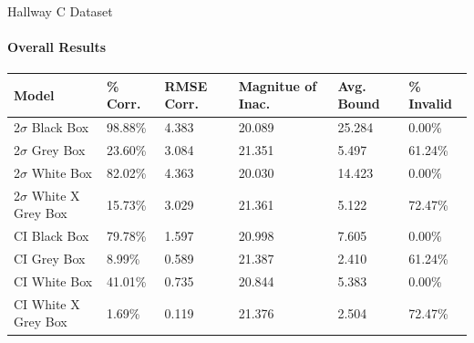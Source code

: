 \documentclass{beamer}
\begin{document}
\begin{frame}[t]{Hallway C Dataset}
  \framesubtitle{Overall Results}

  \vspace*{-0.5cm}
  \begin{table}[htp!]
  \small
  \begin{tabular}{|p{2.5cm}|p{1.3cm}|p{1.0cm}|p{1.7cm}|p{1.0cm}|p{1.5cm}|}

      \hline
      \textbf{Model} &
      \textbf{\% Corr.} &
      \textbf{RMSE Corr.} &
      \textbf{Magnitue of Inac.} &
      \textbf{Avg. Bound} &
      \textbf{\% Invalid} \\
      \hline

      2$\sigma$ Black Box &
      98.88\% &
      4.383 &
      20.089 &
      25.284 &
      0.00\% \\
      \hline

      2$\sigma$ Grey Box &
      23.60\% &
      3.084 &
      21.351 &
      5.497 &
      61.24\% \\
      \hline

      2$\sigma$ White Box &
      82.02\% &
      4.363 &
      20.030 &
      14.423 &
      0.00\% \\
      \hline

      2$\sigma$ White X Grey Box &
      15.73\% &
      3.029 &
      21.361 &
      5.122 &
      72.47\% \\
      \hline

      CI Black Box &
      79.78\% &
      1.597 &
      20.998 &
      7.605 &
      0.00\% \\
      \hline

      CI Grey Box &
      8.99\% &
      0.589 &
      21.387 &
      2.410 &
      61.24\% \\
      \hline

      CI White Box &
      41.01\% &
      0.735 &
      20.844 &
      5.383 &
      0.00\% \\
      \hline

      CI White X Grey Box &
      1.69\% &
      0.119 &
      21.376 &
      2.504 &
      72.47\% \\
      \hline



\end{tabular}
\end{table}

\end{frame}
\end{document}
